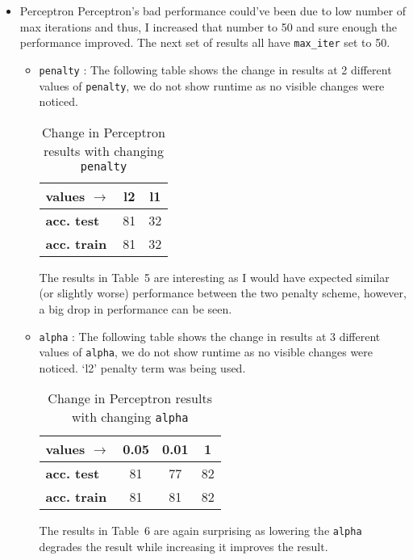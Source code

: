 \documentclass[12pt]{article}
\begin{document}
\begin{itemize}
\item Perceptron
Perceptron's bad performance could've been due to low number of max iterations and thus, I increased that number to 50 and sure enough the performance improved. The next set of results all have \texttt{max\_iter} set to 50.

\begin{itemize}
\item \texttt{penalty} : The following table shows the change in results at 2 different values of \texttt{penalty}, we do not show runtime as no visible changes were noticed.
\begin{table}[!hptb]
\centering
\begin{tabular}{|l|c|c|}
\hline
\textbf{values $\to$} & \textbf{l2} & \textbf{l1} \\\hline
\textbf{acc. test} & 81 & 32 \\
\textbf{acc. train} & 81 & 32 \\\hline
\end{tabular}
\caption{Change in Perceptron results with changing \texttt{penalty}}
\end{table}
The results in Table~5 are interesting as I would have expected similar (or slightly worse) performance between the two penalty scheme, however, a big drop in performance can be seen.

\item \texttt{alpha} : The following table shows the change in results at 3 different values of \texttt{alpha}, we do not show runtime as no visible changes were noticed. `l2' penalty term was being used.
\begin{table}[!hptb]
\centering
\begin{tabular}{|l|c|c|c|}
\hline
\textbf{values $\to$} & \textbf{0.05} & \textbf{0.01} & \textbf{1} \\\hline
\textbf{acc. test} & 81 & 77 & 82 \\
\textbf{acc. train} & 81 & 81 & 82 \\\hline
\end{tabular}
\caption{Change in Perceptron results with changing \texttt{alpha}}
\end{table}
The results in Table~6 are again surprising as lowering the \texttt{alpha} degrades the result while increasing it improves the result.


\end{itemize}
\end{itemize}
\end{document}
